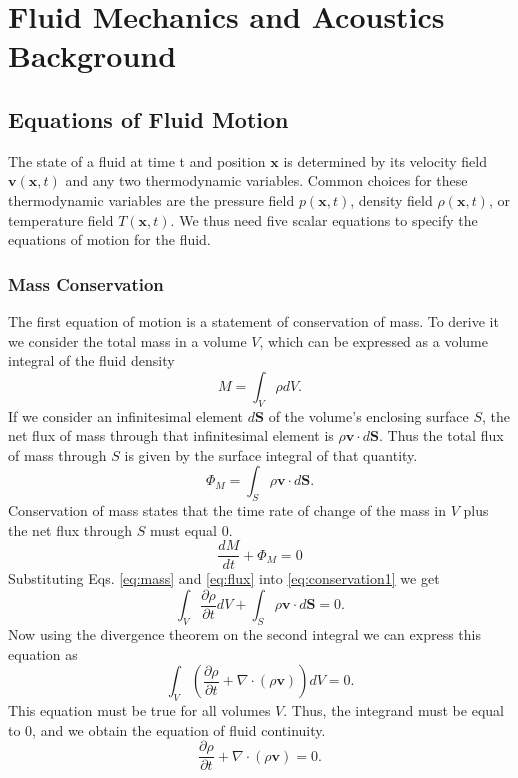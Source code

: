 \documentclass[12pt, letter]{report}
\begin{document}
\chapter{Fluid Mechanics and Acoustics Background}
\section{Equations of Fluid Motion}
The state of a fluid at time t and position $\textbf{x}$ is determined by its velocity field $\textbf{v}(\textbf{x}, t)$ and any two thermodynamic variables. Common choices for these thermodynamic variables are the pressure field $p(\textbf{x}, t)$, density field $\rho(\textbf{x}, t)$, or temperature field $T(\textbf{x}, t)$. We thus need five scalar equations to specify the equations of motion for the fluid.

\subsection{Mass Conservation}
The first equation of motion is a statement of conservation of mass. To derive it we consider the total mass in a volume $V$, which can be expressed as a volume integral of the fluid density
\begin{equation}
\label{eq:mass}
M = \int_V \rho dV.
\end{equation}
If we consider an infinitesimal element $d\textbf{S}$ of the volume's enclosing surface $S$, the net flux of mass through that infinitesimal element is $\rho \textbf{v} \cdot d\textbf{S}$. Thus the total flux of mass through $S$ is given by the surface integral of that quantity.
\begin{equation}
\label{eq:flux}
\Phi_M = \int_S \rho \textbf{v} \cdot d\textbf{S}.
\end{equation}
Conservation of mass states that the time rate of change of the mass in $V$ plus the net flux through $S$ must equal $0$.
\begin{equation}
\label{eq:conservation1}
\frac{d M}{d t} + \Phi_M = 0
\end{equation}
Substituting Eqs. \ref{eq:mass} and \ref{eq:flux} into \ref{eq:conservation1} we get
\begin{equation}
\int_V \frac{\partial \rho}{\partial t} dV + \int_S \rho \textbf{v} \cdot d\textbf{S} = 0.
\end{equation}
Now using the divergence theorem on the second integral we can express this equation as
\begin{equation}
\int_V \left(\frac{\partial \rho}{\partial t} + \nabla \cdot \left( \rho \textbf{v} \right)\right) dV = 0.
\end{equation}
This equation must be true for all volumes $V$. Thus, the integrand must be equal to $0$, and we obtain the equation of fluid continuity.
\begin{equation}
\label{eq:continuity}
\frac{\partial \rho}{\partial t} + \nabla \cdot \left( \rho \textbf{v} \right)=0.
\end{equation}
\end{document}
